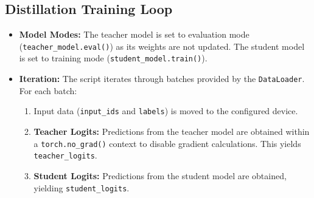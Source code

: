 \documentclass[12pt, a4paper]{report}
\begin{document}
\subsection{Distillation Training Loop}
\begin{itemize}
    \item \textbf{Model Modes:} The teacher model is set to evaluation mode (\texttt{teacher\_model.eval()}) as its weights are not updated. The student model is set to training mode (\texttt{student\_model.train()}).
    \item \textbf{Iteration:} The script iterates through batches provided by the \texttt{DataLoader}. For each batch:
        \begin{enumerate}
            \item Input data (\texttt{input\_ids} and \texttt{labels}) is moved to the configured device.
            \item \textbf{Teacher Logits:} Predictions from the teacher model are obtained within a \texttt{torch.no\_grad()} context to disable gradient calculations. This yields \texttt{teacher\_logits}.
            \item \textbf{Student Logits:} Predictions from the student model are obtained, yielding \texttt{student\_logits}.
        \end{enumerate}
\end{itemize}
\end{document}
